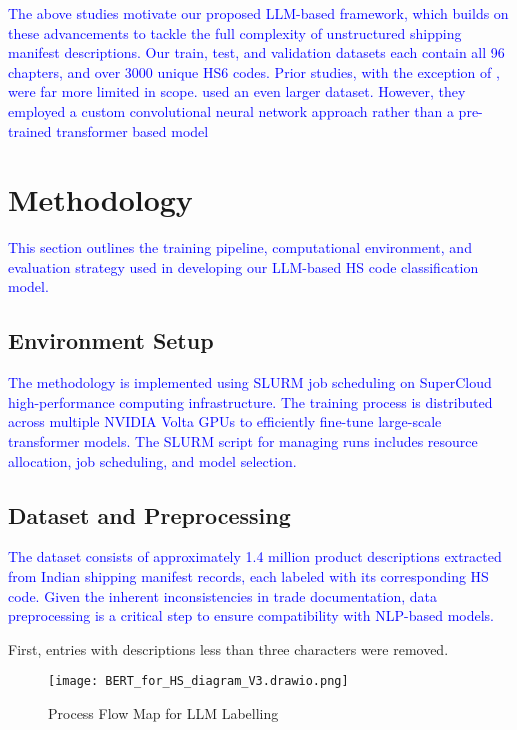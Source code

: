 \documentclass[mnsc,nonblindrev]{informs3} %
\begin{document}
\textcolor{blue}{The above studies motivate our proposed LLM-based framework, which builds on these advancements to tackle the full complexity of unstructured shipping manifest descriptions. Our train, test, and validation datasets each contain all 96 chapters, and over 3000 unique HS6 codes. Prior studies, with the exception of \citet{Luppes2019}, were far more limited in scope. \citet{Luppes2019} used an even larger dataset. However, they employed a custom convolutional neural network approach rather than a pre-trained transformer based model}

\section{Methodology}
\textcolor{blue}{This section outlines the training pipeline, computational environment, and evaluation strategy used in developing our LLM-based HS code classification model.}

\subsection{Environment Setup}
\textcolor{blue}{The methodology is implemented using SLURM job scheduling on SuperCloud high-performance computing infrastructure. The training process is distributed across multiple NVIDIA Volta GPUs to efficiently fine-tune large-scale transformer models. The SLURM script for managing runs includes resource allocation, job scheduling, and model selection.} 

\subsection{Dataset and Preprocessing}
\textcolor{blue}{The dataset consists of approximately 1.4 million product descriptions extracted from Indian shipping manifest records, each labeled with its corresponding HS code. Given the inherent inconsistencies in trade documentation, data preprocessing is a critical step to ensure compatibility with NLP-based models.}

First, entries with descriptions less than three characters were removed. 


\textcolor{blue}{}

\begin{figure}[h]  
    \centering
    \texttt{[image: BERT\_for\_HS\_diagram\_V3.drawio.png]} 
    \textcolor{blue}{\caption{Process Flow Map for LLM Labelling}}
    \label{fig:image_label}
\end{figure}
\end{document}
